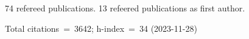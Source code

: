 74 refereed publications. 13 refeered publications as first author.

Total citations~=~3642; h-index~=~34 (2023-11-28)